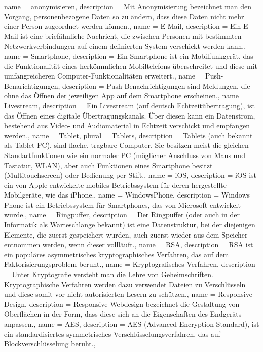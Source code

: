 {
  name = anonymisieren,
  description = {Mit Anonymisierung bezeichnet man den Vorgang, personenbezogene Daten so zu ändern, dass diese Daten nicht mehr einer Person zugeordnet werden können.},
}
{
  name = E-Mail,
  description = {Ein E-Mail ist eine briefähnliche Nachricht, die zwischen Personen mit bestimmten Netzwerkverbindungen auf einem definierten System verschickt werden kann.},
}
{
  name = Smartphone,
  description = {Ein Smartphone ist ein Mobilfunkgerät, das die Funktionalität eines herkömmlichen Mobiltelefons überschreitet und diese mit umfangreicheren Computer-Funktionalitäten erweitert.},
}
{
  name = Push-Benarichtigungen,
  description = {Push-Benachrichtigungen sind Meldungen, die ohne das Öffnen der jeweiligen \gls{App} auf dem \gls{Smartphone} erscheinen.},
}
{
  name = Livestream,
  description = {Ein Livestream (auf deutsch Echtzeitübertragung), ist das Öffnen eines digitale Übertragungskanals. Über diesen kann ein Datenstrom, bestehend aus Video- und Audiomaterial in Echtzeit verschickt und empfangen werden.},
}
{
  name = Tablet,
  plural = Tablets,
  description = {Tablets (auch bekannt als Tablet-PC), sind flache, tragbare Computer. Sie besitzen meist die gleichen Standartfunktionen wie ein normaler PC (möglicher Anschluss von Maus und Tastatur, WLAN), aber auch Funktionen eines \gls{Smartphone} besitzt (Multitouchscreen) oder Bedienung per Stift.},
}
{
  name = iOS,
  description = {iOS ist ein von Apple entwickelte mobiles Betriebssystem für deren hergestellte Mobilgeräte, wie das iPhone.},
}
{
  name = WindowsPhone,
  description = {Windows Phone ist ein Betriebssystem für Smartphones, das von Microsoft entwickelt wurde.},
}
{
  name = Ringpuffer,
  description = {Der Ringpuffer (oder auch in der Informatik als Warteschlange bekannt) ist eine Datenstruktur, bei der diejenigen Elemente, die zuerst gespeichert wurden, auch zuerst wieder aus dem Speicher entnommen werden, wenn dieser vollläuft.},
}
{
  name = RSA,
  description = {RSA ist ein populäres asymmetrisches kryptographisches Verfahren, das auf dem Faktorisierungsproblem beruht.},
}
{
  name = Kryptografisches Verfahren,
  description = {Unter Kryptografie versteht man die Lehre von Geheimschriften. Kryptographische Verfahren werden dazu verwendet Dateien zu Verschlüsseln und diese somit vor nicht autorisierten Lesern zu schützen.},
}
{
  name = Responsive-Design,
  description = {Responsive Webdesign bezeichnet die Gestaltung von Oberflächen in der Form, dass diese sich an die Eigenschaften des Endgeräts anpassen.},
}
{
  name = AES,
  description = {AES (Advanced Encryption Standard), ist ein standardisiertes symmetrisches Verschlüsselungsverfahren, das auf Blockverschlüsselung beruht.},
}


